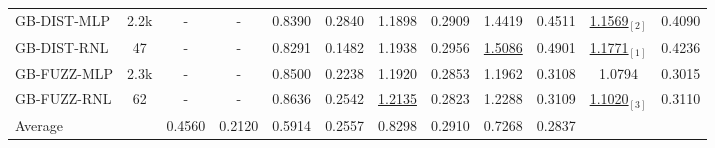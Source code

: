 \begin{table*}[ht!]
{\begin{tabular}{lccc|cc|cc|cc|cc}
            \hline
            GB-DIST-MLP             
                & 2.2k & - & - & 0.8390	& 0.2840 & 1.1898 & 0.2909 & 1.4419	& 0.4511 & \underline{1.1569}$_{[2]}$ & 0.4090\\
            GB-DIST-RNL             
                & 47 & - & - & 0.8291 & 0.1482 & 1.1938 & 0.2956 & \underline{1.5086} & 0.4901 & \underline{1.1771}$_{[1]}$ & 0.4236\\
            \hline
            GB-FUZZ-MLP             
                & 2.3k & - & - & 0.8500	& 0.2238 & 1.1920 & 0.2853 & 1.1962	& 0.3108 & 1.0794 & 0.3015\\
            GB-FUZZ-RNL             
                & 62 & - & - & 0.8636 & 0.2542 & \underline{1.2135}	& 0.2823 & 1.2288 & 0.3109 & \underline{1.1020}$_{[3]}$ & 0.3110\\
            \hline
            Average 
                &   & 0.4560 & 0.2120 & 0.5914 & 0.2557 & 0.8298 & 0.2910 & 0.7268 & 0.2837\\
            \hline
            \hline
        \end{tabular}
    }
\end{table*}